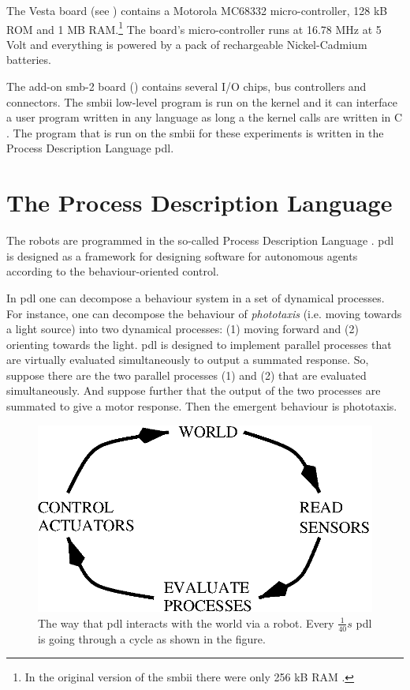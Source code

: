 The Vesta board (see ) contains a Motorola MC68332 micro-controller, 128 kB ROM and 1 MB RAM.\footnote{In the original version of the {\sc smbii} there were only 256 kB RAM \citep{vereertbrugghen:1996}.} The board's micro-controller runs at 16.78 MHz at 5 Volt and everything is powered by a pack of rechargeable Nickel-Cadmium batteries.

The add-on {\sc smb}-2 board () contains several I/O chips, bus controllers and connectors. The {\sc smbii} low-level program is run on the kernel and it can interface a user program written in any language as long a the kernel calls are written in C  \citep{vereertbrugghen:1996}. The program that is run on the {\sc smbii} for these experiments is written in the Process Description Language {\sc pdl}. 

\section{The Process Description Language}\label{s:robots:PDL}\label{s:robots:pdl}

The robots are programmed in the so-called Process Description Language \citep{steels:1992,steels:1994a,steels:1994b}. {\sc pdl} is designed as a framework for designing software for autonomous agents according to the behaviour-oriented control. 

In {\sc pdl} one can decompose a behaviour system in a set of dynamical processes. For instance, one can decompose the behaviour of {\em phototaxis} (i.e. moving towards a light source) into two dynamical processes: (1) moving forward and (2) orienting towards the light. {\sc pdl} is designed to implement parallel processes that are virtually evaluated simultaneously to output a summated response. So, suppose there are the two parallel processes (1) and (2) that are evaluated  simultaneously. And suppose further that the output of the two processes are summated to give a motor response. Then the emergent behaviour is phototaxis. 

\begin{figure}
\centerline{\includegraphics[width=12cm]{robots//pdlcycle.eps}}
\caption{The way that {\sc pdl} interacts with the world via a robot. Every $\frac{1}{40} s$ {\sc pdl} is going through a cycle as shown in the figure.}
\label{f:pdlcycle}
\end{figure}

